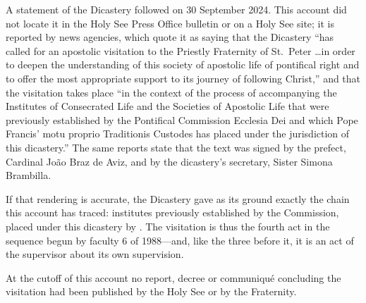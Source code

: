 A statement of the Dicastery followed on 30 September 2024. This account
did not locate it in the Holy See Press Office bulletin or on a Holy See
site; it is reported by news agencies, which quote it as saying that the
Dicastery ``has called for an apostolic visitation to the Priestly
Fraternity of St.\ Peter \ldots in order to deepen the understanding of
this society of apostolic life of pontifical right and to offer the most
appropriate support to its journey of following Christ,'' and that the
visitation takes place ``in the context of the process of accompanying the
Institutes of Consecrated Life and the Societies of Apostolic Life that
were previously established by the Pontifical Commission Ecclesia Dei and
which Pope Francis' motu proprio Traditionis Custodes has placed under
the jurisdiction of this dicastery.'' The same reports state that the text
was signed by the prefect, Cardinal João Braz de Aviz, and by the
dicastery's secretary, Sister Simona Brambilla.

If that rendering is accurate, the Dicastery gave as its ground exactly
the chain this account has traced: institutes previously established by
the Commission, placed under this dicastery by . The visitation is thus the fourth act in the sequence begun by
faculty 6 of 1988---and, like the three before it, it is an act of the
supervisor about its own supervision.

At the cutoff of this account no report, decree or communiqué concluding
the visitation had been published by the Holy See or by the
Fraternity.

